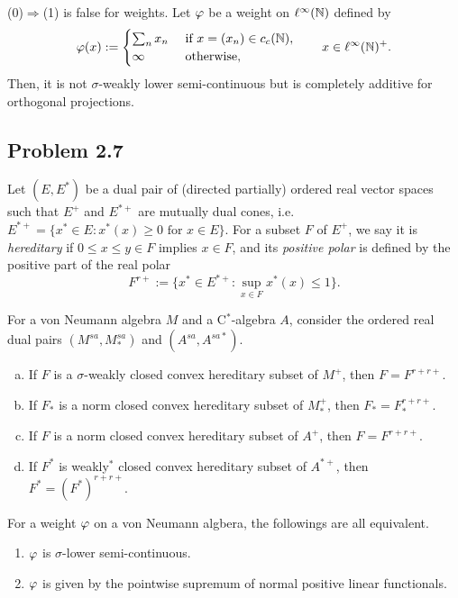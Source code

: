 \documentclass{../../../../small}
\begin{document}
\begin{rmk*}
(0)$\Rightarrow$(1) is false for weights.
Let $\varphi$ be a weight on $\ell^\infty(\mathbb{N})$ defined by
\[\varphi(x):=\begin{cases}
\sum_nx_n&\text{ if }x=(x_n)\in c_c(\mathbb{N}),\\
\infty&\text{ otherwise},
\end{cases}\qquad x\in\ell^\infty(\mathbb{N})^+.\]
Then, it is not $\sigma$-weakly lower semi-continuous but is completely additive for orthogonal projections.
\end{rmk*}







\subsection{Problem 2.7}

\begin{defn*}
Let $(E,E^*)$ be a dual pair of (directed partially) ordered real vector spaces such that $E^+$ and $E^{*+}$ are mutually dual cones, i.e.~$E^{*+}=\{x^*\in E:x^*(x)\ge0\text{ for }x\in E\}$.
For a subset $F$ of $E^+$, we say it is \emph{hereditary} if $0\le x\le y\in F$ implies $x\in F$, and its \emph{positive polar} is defined by the positive part of the real polar
\[F^{r+}:=\{x^*\in E^{*+}:\sup_{x\in F}x^*(x)\le1\}.\]
\end{defn*}

\begin{thm*}[Haagerup 1975, C.~2025]
For a von Neumann algebra $M$ and a C$^*$-algebra $A$, consider the ordered real dual pairs $(M^{sa},M_*^{sa})$ and $(A^{sa},A^{sa*})$.
\begin{enumerate}[(a)]
\item If $F$ is a $\sigma$-weakly closed convex hereditary subset of $M^+$, then $F=F^{r+r+}$.
\item If $F_*$ is a norm closed convex hereditary subset of $M_*^+$, then $F_*=F_*^{r+r+}$.
\item If $F$ is a norm closed convex hereditary subset of $A^+$, then $F=F^{r+r+}$.
\item If $F^*$ is weakly$^*$ closed convex hereditary subset of $A^{*+}$, then $F^*=(F^*)^{r+r+}$.
\end{enumerate}
\end{thm*}



\begin{cor*}[Haagerup, 1975]
For a weight $\varphi$ on a von Neumann algbera, the followings are all equivalent.
\begin{enumerate}
\item[(3)] $\varphi$ is $\sigma$-lower semi-continuous.
\item[(4)] $\varphi$ is given by the pointwise supremum of normal positive linear functionals.
\end{enumerate}
\end{cor*}
\end{document}
